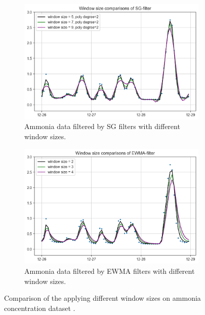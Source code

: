 \begin{figure}[!ht]
    \centering
    \begin{subfigure}{0.7\textwidth}
      \includegraphics[width=\linewidth]{imgs/pre-processing/sg-filter.png}
      \caption{Ammonia data filtered by SG filters with different window sizes.} \label{fig:smoothed-sg}
    \end{subfigure}%
    \hspace{2em}%
    \begin{subfigure}{0.7\textwidth}
      \includegraphics[width=\linewidth]{imgs/pre-processing/ew-filter.png}
      \caption{Ammonia data filtered by EWMA filters with different window sizes.} \label{fig:smoothed-ew}
    \end{subfigure}%
  \caption{Comparison of the applying different window sizes on ammonia concentration dataset .} \label{fig:smoothed}
\end{figure}


